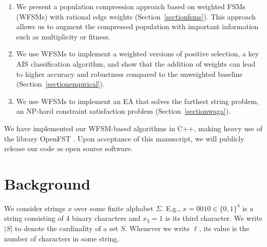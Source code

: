 \documentclass{llncs}
\begin{document}
\begin{enumerate}
\item We present a population compression approach based on weighted FSMs (WFSMs) with rational
edge weights (Section~\ref{sectionfsms}). This approach allows us to augment the compressed population with important information such as multiplicity or fitness. 
\item We use WFSMs to implement a weighted versions of positive selection, a key AIS classification algorithm, and show that the addition of weights can lead to higher accuracy and robustness compared to the unweighted baseline (Section~\ref{sectionempirical}).
\item We use WFSMs to implement an EA that solves the farthest string problem, an NP-hard constraint satisfaction problem (Section~\ref{sectionwaga}).

\end{enumerate}


We have implemented our WFSM-based algorithms in C++, making heavy use of the library OpenFST \cite{openfst}. Upon acceptance of this manuscript, we will publicly release our code as open source software. %

\section{Background}

\label{sectionbackground}

We consider strings $x$ over some finite alphabet $\Sigma$.
E.g., $x=0010 \in \{0,1\}^4$ is a string consisting of 4 binary characters and $x_3=1$ is its third character.
We write $|S|$ to denote the cardinality of a set $S$.
Whenever we write $\ell$, its value is the number of characters in some string.
\end{document}
